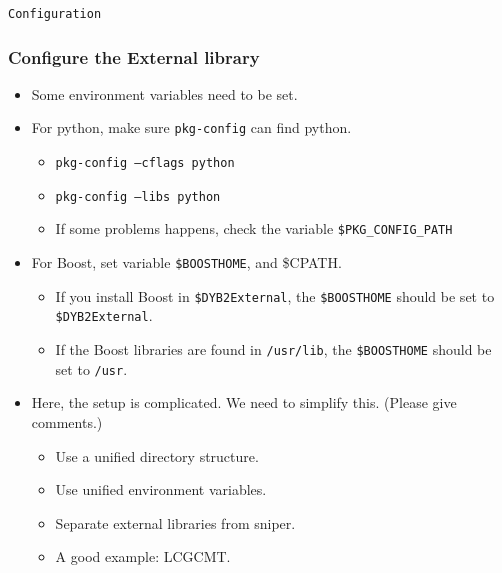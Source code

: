 \begin{frame}
    \begin{center}
        \LARGE \tt{Configuration}
    \end{center}
\end{frame}

\begin{frame}
    \frametitle{Configure the External library}
    \begin{itemize}
        \item Some environment variables need to be
            set.
        \item For python, make sure {\tt pkg-config}
            can find python.
            \begin{itemize}
                \item {\tt pkg-config --cflags python}
                \item {\tt pkg-config --libs python}
                \item If some problems happens, check
                    the variable {\tt \$PKG\_CONFIG\_PATH}
            \end{itemize}
        \item For Boost, set variable {\tt \$BOOSTHOME}, and {\$CPATH}.
            \begin{itemize}
                \item If you install Boost in {\tt \$DYB2External},
                    the {\tt \$BOOSTHOME} should be set to
                    {\tt \$DYB2External}.
                \item If the Boost libraries are found in 
                    {\tt /usr/lib}, the {\tt \$BOOSTHOME}
                    should be set to {\tt /usr}.
            \end{itemize}
        \item Here, the setup is complicated.
            We need to simplify this. (Please give comments.)
            \begin{itemize}
                \item Use a unified directory structure.
                \item Use unified environment variables.
                \item Separate external libraries from sniper.
                \item A good example: LCGCMT.
            \end{itemize}
    \end{itemize}
\end{frame}

